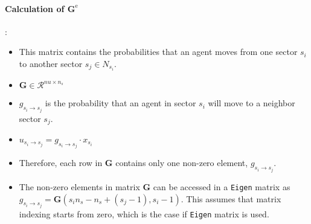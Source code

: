 \documentclass{article}
\begin{document}
\paragraph{Calculation of $\mathbf{G}^{\text{e}}$}: 
\begin{itemize}
\item This matrix contains the probabilities that an agent moves from one sector $s_i$ to another sector $s_j \in N_{s_i}$.
\item  $\mathbf{G} \in \mathcal{R}^{nu \times n_s}$
\item $g_{s_i \rightarrow s_j}$ is the probability that an agent in sector $s_i$ will move to a neighbor sector $s_j$.
\item $u_{s_i \rightarrow s_j} = g_{s_i \rightarrow s_j} \cdot x_{s_i}$
\item Therefore, each row in $\mathbf{G}$ contains only one non-zero element, $g_{s_i \rightarrow s_j}$.
\item The non-zero elements in matrix $\mathbf{G}$ can be accessed in a \texttt{Eigen} matrix as $g_{s_i \rightarrow s_j} = \mathbf{G}(s_i n_s - n_s + (s_j-1), s_i -1 )$. This assumes that matrix indexing starts from zero, which is the case if \texttt{Eigen} matrix is used.
\end{itemize}


%
\end{document}
